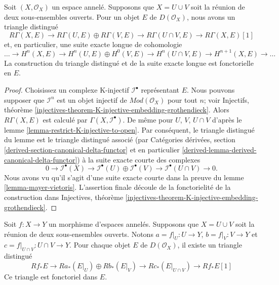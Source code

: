 {\begin{lemma}

\label{lemma-unbounded-mayer-vietoris}
Soit $(X, \mathcal{O}_X)$ un espace annelé. Supposons que $X = U \cup V$ soit la réunion de deux sous-ensembles ouverts. Pour un objet $E$ de $D(\mathcal{O}_X)$, nous avons un triangle distingué $$
R\Gamma(X, E) \to R\Gamma(U, E) \oplus R\Gamma(V, E) \to
R\Gamma(U \cap V, E) \to R\Gamma(X, E)[1]
$$ et, en particulier, une suite exacte longue de cohomologie $$
\ldots \to
H^n(X, E) \to
H^n(U, E) \oplus H^0(V, E) \to
H^n(U \cap V, E) \to
H^{n + 1}(X, E) \to \ldots
$$ La construction du triangle distingué et de la suite exacte longue est fonctorielle en $E$.
\end{lemma}

\begin{proof}

Choisissez un complexe K-injectif $\mathcal{I}^\bullet$
représentant $E$. Nous pouvons supposer que $\mathcal{I}^n$ est un objet injectif de $\textit{Mod}(\mathcal{O}_X)$ pour tout $n$; voir Injectifs, théorème
\ref{injectives-theorem-K-injective-embedding-grothendieck}. Alors $R\Gamma(X, E)$ est calculé par $\Gamma(X, \mathcal{I}^\bullet)$. De même pour $U$, $V$, $U \cap V$ d'après le lemme \ref{lemma-restrict-K-injective-to-open}. Par conséquent, le triangle distingué du lemme est le triangle distingué associé (par Catégories dérivées, section
\ref{derived-section-canonical-delta-functor} et en particulier \ref{derived-lemma-derived-canonical-delta-functor}) à la suite exacte courte des complexes
$$
0 \to
\mathcal{I}^\bullet(X) \to
\mathcal{I}^\bullet(U) \oplus \mathcal{I}^\bullet(V) \to
\mathcal{I}^\bullet(U \cap V) \to
0.
$$
Nous avons vu qu'il s'agit d'une suite exacte courte dans la preuve du lemme \ref{lemma-mayer-vietoris}. L'assertion finale découle de la fonctorielité de la construction dans Injectives, théorème
\ref{injectives-theorem-K-injective-embedding-grothendieck}.

\end{proof}

\begin{lemma}

\label{lemma-unbounded-relative-mayer-vietoris}
Soit $f : X \to Y$ un morphisme d'espaces annelés. Supposons que $X = U \cup V$ soit la réunion de deux sous-ensembles ouverts. Notons $a = f|_U : U \to Y$, $b = f|_V : V \to Y$ et $c = f|_{U \cap V} : U \cap V \to Y$. Pour chaque objet $E$ de $D(\mathcal{O}_X)$, il existe un triangle distingué $$
Rf_*E \to
Ra_*(E|_U) \oplus Rb_*(E|_V) \to
Rc_*(E|_{U \cap V}) \to
Rf_*E[1]
$$ Ce triangle est fonctoriel dans $E$.
\end{lemma}

}
